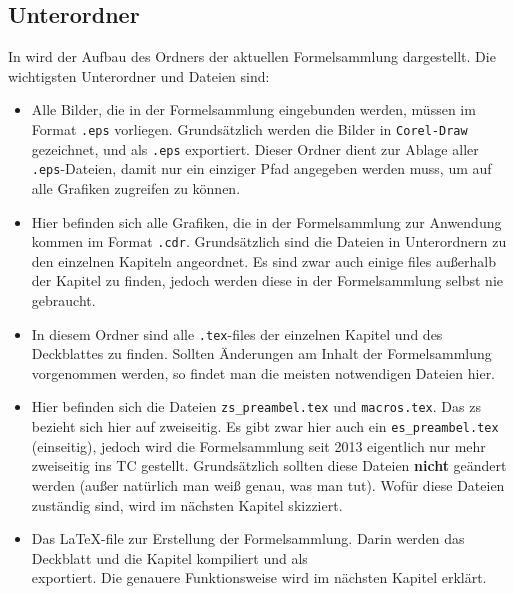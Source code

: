 \subsection{Unterordner }
In  wird der Aufbau des Ordners der aktuellen
Formelsammlung dargestellt. Die wichtigsten Unterordner und Dateien sind:

\begin{itemize}
  \item {} Alle Bilder, die in der Formelsammlung eingebunden
    werden, müssen im Format {\tt .eps} vorliegen. Grundsätzlich werden die
    Bilder in {\tt Corel-Draw} gezeichnet, und als {\tt .eps} exportiert. Dieser
    Ordner dient zur Ablage aller {\tt .eps}-Dateien, damit nur ein einziger
    Pfad angegeben werden muss, um auf alle Grafiken zugreifen zu können.
  \item {} Hier befinden sich alle Grafiken, die
    in der Formelsammlung zur Anwendung kommen im Format {\tt .cdr}. 
    Grundsätzlich sind die Dateien in Unterordnern zu den einzelnen Kapiteln
    angeordnet. Es sind zwar auch einige files außerhalb der Kapitel zu finden,
    jedoch werden diese in der Formelsammlung selbst nie gebraucht.
  \item {} In diesem Ordner sind alle {\tt .tex}-files der
    einzelnen Kapitel und des Deckblattes zu finden. Sollten Änderungen
    am Inhalt der Formelsammlung vorgenommen werden, so findet man die meisten
    notwendigen Dateien hier.
  \item {} Hier befinden sich die Dateien {\tt zs\_preambel.tex}
    und {\tt macros.tex}. Das \glqq{}zs\grqq{} bezieht sich hier auf 
    \glqq{}zweiseitig\grqq{}. Es gibt zwar hier auch ein {\tt es\_preambel.tex}
    (\glqq{}einseitig\grqq{}), jedoch wird die Formelsammlung seit 2013 
    eigentlich nur mehr zweiseitig ins TC gestellt. Grundsätzlich sollten diese
    Dateien {\bf nicht} geändert werden (außer natürlich man weiß genau, was
    man tut).
    Wofür diese Dateien zuständig sind, wird im nächsten Kapitel skizziert.
  \item {} Das \LaTeX-file zur
    Erstellung der Formelsammlung. Darin werden das Deckblatt und die Kapitel
    kompiliert und als \\
    exportiert. Die genauere Funktionsweise wird im nächsten Kapitel erklärt.
\end{itemize}

